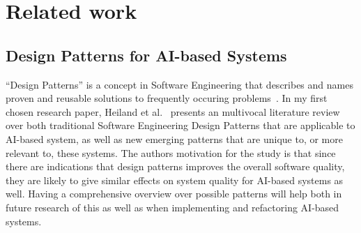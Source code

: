 \documentclass[a4paper,twocolumn]{article}
\begin{document}
\section{Related work}

% 

\subsection{Design Patterns for AI-based Systems}

``Design Patterns'' is a concept in Software Engineering that describes and
names proven and reusable solutions to frequently occuring
problems~\cite{Gamma2001}. In my first chosen research paper, Heiland et
al.~\cite{heiland_design_2023} presents an multivocal literature review over both traditional
Software Engineering Design Patterns that are applicable to AI-based system, as
well as new emerging patterns that are unique to, or more relevant to, these
systems. The authors motivation for the study is that since there are
indications that design patterns improves the overall software quality, they are
likely to give similar effects on system quality for AI-based systems as well.
Having a comprehensive overview over possible patterns will help both in future
research of this as well as when implementing and refactoring AI-based systems.
\end{document}
